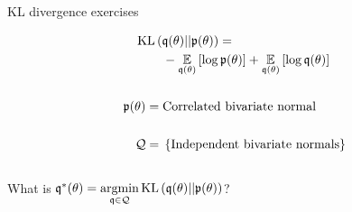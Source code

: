 
\begin{frame}{KL divergence exercises}
\begin{minipage}{0.5\textwidth}
\begin{align*}
%
\MoveEqLeft
\kl{\q(\theta)}{\p(\theta)} ={}\\&
-\expect{\q(\theta)}{\log \p(\theta)} +
\expect{\q(\theta)}{\log \q(\theta)}\\ \\
\p(\theta) ={}& \textrm{Correlated bivariate normal}\\ \\
%
\qdom ={}& \left\{ \textrm{Independent bivariate normals}\right\}\\ \\
%
\end{align*}
%
What is
$\mathfrak{q}^*(\theta) = \underset{\mathfrak{q} \in \mathcal{Q}}{\mathrm{argmin}}\, \mathrm{KL}\left(\mathfrak{q}(\theta) || \mathfrak{p}(\theta) \right)$?
%
\end{minipage}
%
\begin{minipage}{0.4\textwidth}

\end{minipage}


\end{frame}






